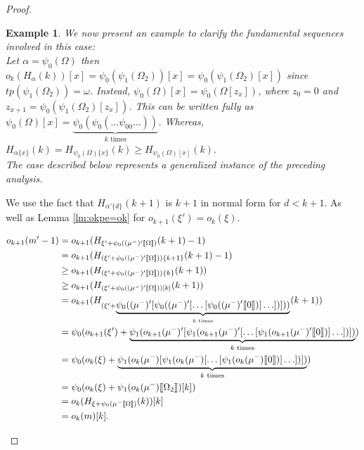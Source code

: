 \documentclass{amsart}
\theoremstyle{plain}
\theoremstyle{plain}
\newtheorem{example}[theorem]{Example}
\def\scbrl{[\hspace{-.14em}[}
\def\scbrr{]\hspace{-.14em}]}
\def\scbr#1{\scbrl#1\scbrr}
\newcommand{\Om}{{\Omega}}
\newcommand{\okpe}{o_{k+1}}
\newcommand{\ok}{o_{k}}
\newcommand{\al}{{\alpha}}
\newcommand{\om}{\omega}
\def\scbrl{[\hspace{-.14em}[}
\def\scbrr{]\hspace{-.14em}]}
\def\scbr#1{\scbrl#1\scbrr}
\begin{document}
\begin{proof}
\begin{Cases}
\begin{Cases}
\begin{Cases}
            \begin{example}
            We now present an example to clarify the fundamental sequences involved in this case:\\
                Let $\al = \psi_0(\Om)$ then $\ok(H_\al(k))[x]= \psi_0(\psi_1(\Om_2))[x]= \psi_0(\psi_1(\Om_2)[x])$
                since $tp(\psi_1(\Om_2))=\om$.
                Instead, $\psi_0(\Om)[x]=\psi_0(\Om[z_x])$, where $z_0=0$ and $z_{x+1}=\psi_0(\psi_1(\Om_2)[z_x])$.
                This can be written fully as $\psi_0(\Om)[x] = \underbrace{\psi_0(\psi_0(\ldots\psi_00\ldots))}_{k \text{ times}}$.
                Whereas, $H_{\al\{x\}}(k)= H_{\psi_0(\Om)\{x\}}(k)\geq H_{\psi_0(\Om)[x]}(k).$\smallskip\\
                The case described below represents a generalized instance of the preceding analysis.\medskip
            \end{example}
            We use the fact that $H_{\al'\{d\}}(k+1)$ is $k+1$ in normal form for $d<k+1$.
            As well as Lemma \ref{lm:okpe=ok} for $\okpe(\xi') = \ok(\xi)$.
            
            \begin{align*} 
                \okpe(m'-1) &= \okpe(H_{\xi'+\psi_0((\mu^-)'\scbr{\Om})}(k+1) -1)\\
                & = \okpe(H_{(\xi'+\psi_0((\mu^-)'\scbr{\Om}))\{k+1\}}(k+1) -1)\\
                & \geq  \okpe(H_{(\xi'+\psi_0((\mu^-)'\scbr{\Om}))\{k\}}(k+1))\\
                & \geq  \okpe(H_{(\xi'+\psi_0((\mu^-)'\scbr{\Om}))[k]}(k+1))\\
                &= \okpe(H_{(\xi'+\underbrace{\psi_0(
                (\mu^-)'[\psi_0((\mu^-)'[\ldots [\psi_0( (\mu^-)'  \scbr{0})] \ldots ])]
                ))}_{k \text{ times}}
                }(k+1))\\
                &= \psi_0(\okpe(\xi') + \underbrace{
                \psi_1(\okpe(\mu^-)'[\psi_1(\okpe(\mu^-)'[\ldots [\psi_1( \okpe(\mu^-)'  \scbr{0})] \ldots ])])}_{k \text{ times}})\\
                &= \psi_0(\ok(\xi) + \underbrace{
                \psi_1(\ok(\mu^-)[\psi_1(\ok(\mu^-)[\ldots [\psi_1( \ok(\mu^-) \scbr{0})] \ldots ])])}_{k \text{ times}})\\
                &= \psi_0( \ok(\xi)+ \psi_1(\ok(\mu^-)\scbr{\Om_2})[{k}] )\\
                &=\ok(H_{\xi+\psi_0(\mu^-\scbr{\Om})}(k))[k]\\
                &= \ok(m)[k].
            \end{align*}			
        \end{Cases}
    \end{Cases}
\end{Cases}
\end{proof}		
\end{document}
